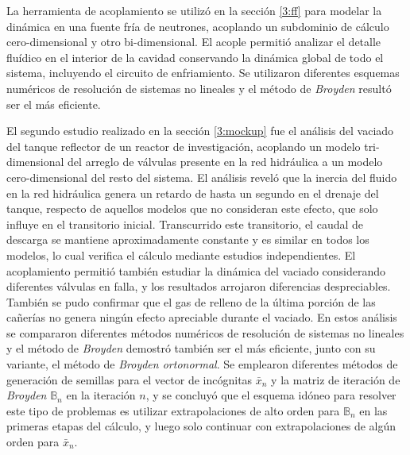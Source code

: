 La herramienta de acoplamiento se utilizó en la sección \ref{3:ff} para modelar la dinámica en una fuente fría de neutrones,
acoplando un subdominio de cálculo cero-dimensional y otro bi-dimensional.
El acople permitió analizar el detalle fluídico en el interior de la cavidad conservando la dinámica global de todo el sistema, incluyendo el circuito de enfriamiento.
Se utilizaron diferentes esquemas numéricos de resolución de sistemas no lineales y el método de \textit{Broyden} resultó ser el más eficiente.

El segundo estudio realizado en la sección \ref{3:mockup} fue el análisis del vaciado del tanque reflector de un reactor de investigación,
acoplando un modelo tri-dimensional del arreglo de válvulas presente en la red hidráulica a un modelo cero-dimensional del resto del sistema.
El análisis reveló que la inercia del fluido en la red hidráulica genera un retardo de hasta un segundo en el drenaje del tanque,
respecto de aquellos modelos que no consideran este efecto, que solo influye en el transitorio inicial.
Transcurrido este transitorio, el caudal de descarga se mantiene aproximadamente constante y es similar en todos los modelos,
lo cual verifica el cálculo mediante estudios independientes.
El acoplamiento permitió también estudiar la dinámica del vaciado considerando diferentes válvulas en falla, y los resultados arrojaron diferencias despreciables.
También se pudo confirmar que el gas de relleno de la última porción de las cañerías no genera ningún efecto apreciable durante el vaciado.
En estos análisis se compararon diferentes métodos numéricos de resolución de sistemas no lineales y el método de \textit{Broyden} demostró también ser el más eficiente,
junto con su variante, el método de \textit{Broyden ortonormal}.
Se emplearon diferentes métodos de generación de semillas para el vector de incógnitas $\bar{x}_n$ y la matriz de iteración de \textit{Broyden} $\mathbb{B}_n$ en la iteración $n$,
y se concluyó que el esquema idóneo para resolver este tipo de problemas es utilizar extrapolaciones de alto orden para $\mathbb{B}_n$ en las primeras etapas del cálculo,
y luego solo continuar con extrapolaciones de algún orden para $\bar{x}_n$.

